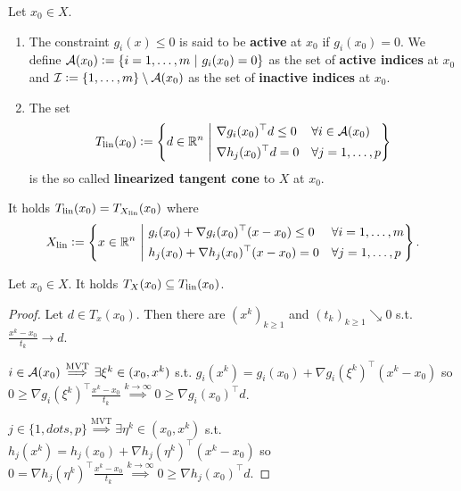 \begin{definition}\label{def1.5}
    Let \(x_0 \in X\).
    \begin{enumerate}
        \item The constraint \(g_i(x) \le 0\) is said to be \textbf{active} at \(x_0\) if \(g_i(x_0) = 0\). We define \(\mathcal{A}(x_0) \mathrel{\mathop:}= \{i = 1,\dots,m \ | \ g_i(x_0) = 0\}\) as the set of \textbf{active indices} at \(x_0\) and \(\mathcal{I} \mathrel{\mathop:}= \{1,\dots,m\} \setminus \mathcal{A}(x_0)\) as the set of \textbf{inactive indices} at \(x_0\).
        \item The set \[T_{\mathrm{lin}}(x_0) \mathrel{\mathop:}= \left\{ d \in \mathbb{R}^n \ \middle| \ \begin{aligned} &\nabla g_i(x_0)^\top d \le 0 &&\forall i \in \mathcal{A}(x_0) \\ &\nabla h_j(x_0)^\top d = 0 &&\forall j = 1,\dots,p \end{aligned} \right\}\] is the so called \textbf{linearized tangent cone} to \(X\) at \(x_0\).
    \end{enumerate}
\end{definition}

\begin{remark}\label{rem1.6}
    It holds \(T_{\mathrm{lin}}(x_0) = T_{X_\mathrm{lin}}(x_0)\) where \[X_\mathrm{lin} \defeq \left\{ x \in \R^n \ \middle| \ \begin{aligned} & g_i(x_0) + \nabla g_i(x_0)^\top (x - x_0) \le 0 && \forall i = 1,\dots,m \\ & h_j(x_0) + \nabla h_j(x_0)^\top (x - x_0) = 0 && \forall j = 1,\dots,p \end{aligned} \right\}.\]
\end{remark}

\begin{lemma}\label{lem1.7}
    Let \(x_0 \in X\). It holds \(T_X(x_0) \subseteq T_{\mathrm{lin}}(x_0)\).
\end{lemma}
\begin{proof}
    Let \(d \in T_x(x_0)\). Then there are \((x^k)_{k \ge 1}\) and \((t_k)_{k \ge 1} \searrow 0\) s.t. \(\frac{x^k - x_0}{t_k} \to d\).

    \(i \in \mathcal{A}(x_0) \stackrel{\mathrm{MVT}}{\implies} \exists \xi^k \in (x_0, x^k)\) s.t. \(g_i(x^k) = g_i(x_0) + \nabla g_i(\xi^k)^\top (x^k - x_0)\) so \(0 \ge \nabla g_i(\xi^k)^\top \frac{x^k - x_0}{t_k} \stackrel{k \to \infty}{\implies} 0 \ge \nabla g_i(x_0)^\top d\).

    \(j \in \{1,dots,p\} \stackrel{\mathrm{MVT}}{\implies} \exists \eta^k \in (x_0, x^k)\) s.t. \(h_j(x^k) = h_j(x_0) + \nabla h_j(\eta^k)^\top (x^k - x_0)\) so \(0 = \nabla h_j(\eta^k)^\top \frac{x^k - x_0}{t_k} \stackrel{k \to \infty}{\implies} 0 \ge \nabla h_j(x_0)^\top d\).
\end{proof}

